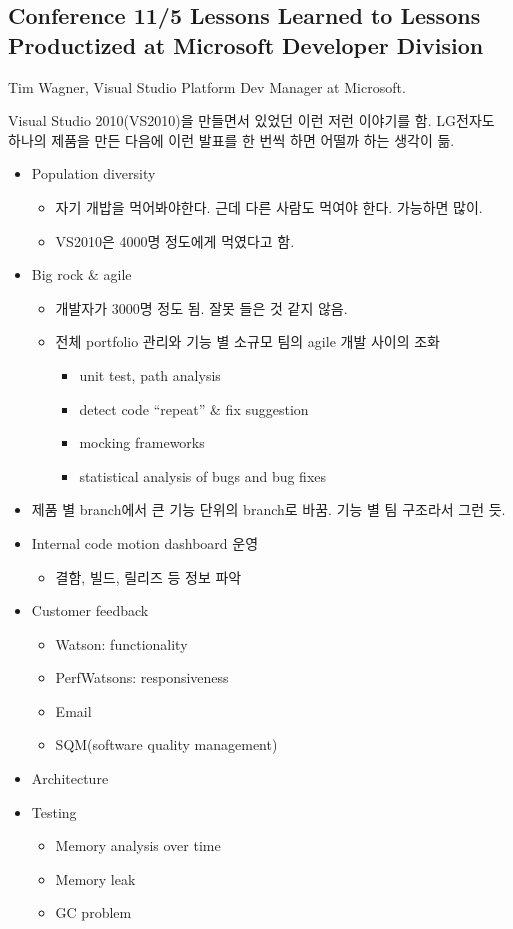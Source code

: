 \documentclass[a4paper]{article}
\begin{document}
\subsection{Conference 11/5 Lessons Learned to Lessons Productized at
  Microsoft Developer Division}
 
Tim Wagner, Visual Studio Platform Dev Manager at Microsoft.
 
Visual Studio 2010(VS2010)을 만들면서 있었던 이런 저런 이야기를
함. LG전자도 하나의 제품을 만든 다음에 이런 발표를 한 번씩 하면 어떨까
하는 생각이 듦.
 
\begin{itemize}
\item Population diversity
    \begin{itemize}
    \item 자기 개밥을 먹어봐야한다. 근데 다른 사람도 먹여야 한다. 가능하면 많이.
    \item VS2010은 4000명 정도에게 먹였다고 함.
    \end{itemize}
\item Big rock \& agile
    \begin{itemize}
    \item 개발자가 3000명 정도 됨. 잘못 들은 것 같지 않음.
    \item 전체 portfolio 관리와 기능 별 소규모 팀의 agile 개발 사이의 조화
        \begin{itemize}
        \item unit test, path analysis
        \item detect code ``repeat'' \& fix suggestion
        \item mocking frameworks
        \item statistical analysis of bugs and bug fixes
        \end{itemize}
    \end{itemize}
\item 제품 별 branch에서 큰 기능 단위의 branch로 바꿈.  기능 별 팀 구조라서 그런 듯.
\item Internal code motion dashboard 운영
    \begin{itemize}
    \item 결함, 빌드, 릴리즈 등 정보 파악
    \end{itemize}
\item Customer feedback
    \begin{itemize}
    \item Watson: functionality
    \item PerfWatsons: responsiveness
    \item Email
    \item SQM(software quality management)
    \end{itemize}
\item Architecture
\item Testing
    \begin{itemize}
    \item Memory analysis over time
    \item Memory leak
    \item GC problem
    \end{itemize}
\end{itemize}
 
\end{document}
